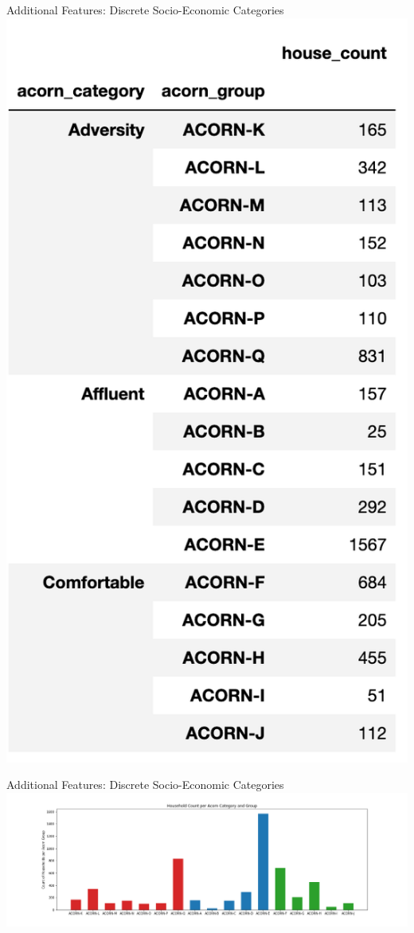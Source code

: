 \documentclass{beamer}
\begin{document}
\begin{frame}{Additional Features: Discrete Socio-Economic Categories}
  \includegraphics[width=1\textwidth]{images/acorn-group-levels.png}
\end{frame}

\begin{frame}{Additional Features: Discrete Socio-Economic Categories}
  \includegraphics[width=1.2\textwidth]{images/acorn-group-category-house-count.png}
\end{frame}
\end{document}
